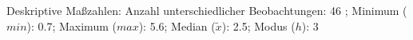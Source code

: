 				\label{tableValues:asch04a}
				\vspace*{-\baselineskip}
                    \begin{noten}
                	    \note{} Deskriptive Maßzahlen:
                	    Anzahl unterschiedlicher Beobachtungen: 46%
                	    ; 
                	      Minimum ($min$): 0.7; 
                	      Maximum ($max$): 5.6; 
                	      Median ($\tilde{x}$): 2.5; 
                	      Modus ($h$): 3
                     \end{noten}

